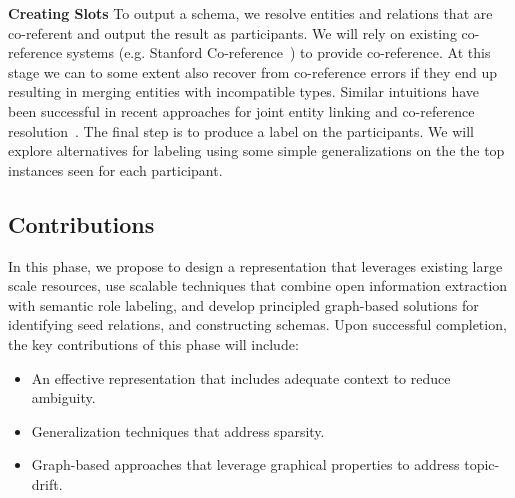\textbf{Creating Slots} To output a schema, we resolve entities and relations that are co-referent and output the result as participants. We will rely on existing co-reference systems (e.g. Stanford Co-reference~\cite{lee2011stanford}) to provide co-reference. At this stage we can to some extent also recover from co-reference errors if they end up resulting in merging entities with incompatible types. Similar intuitions have been successful in recent approaches for joint entity linking and co-reference resolution~\cite{hajishirzi2013joint}. The final step is to produce a label on the participants. We will explore alternatives for labeling using some simple generalizations on the the top instances seen for each participant. 


\subsection{Contributions}

In this phase, we propose to design a representation that leverages existing large scale resources, use scalable  techniques that combine open information extraction with semantic role labeling, and develop principled graph-based solutions for identifying seed relations, and constructing schemas. Upon successful completion, the key contributions of this phase will include:
\begin{itemize}[noitemsep,nolistsep]
\vspace{-1ex}
\item An effective representation that includes adequate context to reduce ambiguity. 
\item Generalization techniques that address sparsity. 
\item Graph-based approaches that leverage graphical properties to address topic-drift. 
\end{itemize}

